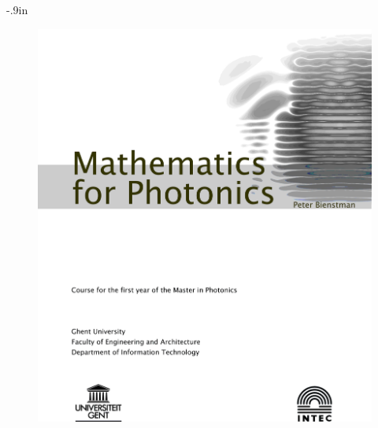 \thispagestyle{empty}

\oddsidemargin -.9in
\begin{figure}
\centering
\includegraphics{preamble/frontpage}
\end{figure}








\thispagestyle{empty}



\cleardoublepage
